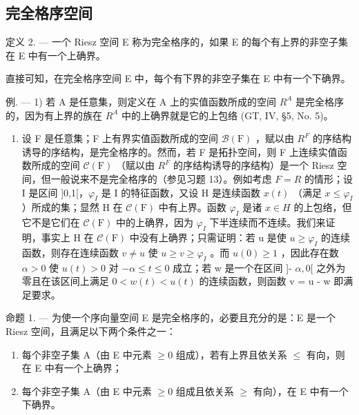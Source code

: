 \subsection{完全格序空间}

定义 2. --- 一个 Riesz 空间 E 称为完全格序的，如果 E 的每个有上界的非空子集在 E 中有一个上确界。

直接可知，在完全格序空间 E 中，每个有下界的非空子集在 E 中有一个下确界。

例. --- 1) 若 A 是任意集，则定义在 A 上的实值函数所成的空间 \(R^{A}\) 是完全格序的，因为有上界的族在 \(R^{A}\) 中的上确界就是它的上包络 (GT, IV, §5, No. 5)。

\begin{enumerate}
\def\labelenumi{\arabic{enumi})}
\setcounter{enumi}{1}
\tightlist
\item
  设 F 是任意集；F 上有界实值函数所成的空间 \(\mathcal{B}(\mathrm{F})\) ，赋以由 \(R^{F}\) 的序结构诱导的序结构，是完全格序的。然而，若 F 是拓扑空间，则 F 上连续实值函数所成的空间 \(\mathcal{C}(\mathrm{F})\) （赋以由 \(R^{F}\) 的序结构诱导的序结构）是一个 Riesz 空间，但一般说来不是完全格序的（参见习题 13）。例如考虑 \(F = R\) 的情形；设 I 是区间 {]}0,1{[}，\(\varphi_{I}\) 是 I 的特征函数，又设 H 是连续函数 \(x(t)\) （满足 \(x \leqslant \varphi_{I}\) ）所成的集；显然 H 在 \(\mathcal{C}(\mathrm{F})\) 中有上界。函数 \(\varphi_{I}\) 是诸 \(x \in H\) 的上包络，但它不是它们在 \(\mathcal{C}(\mathrm{F})\) 中的上确界，因为 \(\varphi_{I}\) 下半连续而不连续。我们来证明，事实上 H 在 \(\mathcal{C}(\mathrm{F})\) 中没有上确界；只需证明：若 u 是使 \(u \geqslant \varphi_{I}\) 的连续函数，则存在连续函数 \(v \neq u\) 使 \(u \geqslant v \geqslant \varphi_{I}\) 。而 \(u(0) \geqslant 1\) ，因此存在数 \(\alpha > 0\) 使 \(u(t) > 0\) 对 \(-\alpha \leqslant t \leqslant 0\) 成立；若 w 是一个在区间 {]}- \(\alpha,0[\) 之外为零且在该区间上满足 \(0 < w(t) < u(t)\) 的连续函数，则函数 v = u - w 即满足要求。
\end{enumerate}

命题 1. --- 为使一个序向量空间 E 是完全格序的，必要且充分的是：E 是一个 Riesz 空间，且满足以下两个条件之一：

\begin{enumerate}
\def\labelenumi{\alph{enumi})}
\item
  每个非空子集 A（由 E 中元素 \(\geqslant0\) 组成），若有上界且依关系 \(\leqslant\) 有向，则在 E 中有一个上确界；
\item
  每个非空子集 A（由 E 中元素 \(\geqslant 0\) 组成且依关系 \(\geqslant\) 有向），在 E 中有一个下确界。
\end{enumerate}

